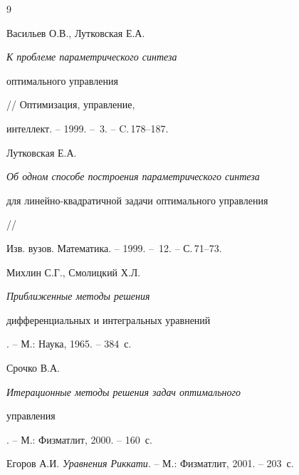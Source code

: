 \begin{thebibliography}{9}







Васильев О.В., Лутковская Е.А. {\it К проблеме параметрического синтеза 


оптимального управления} // Оптимизация, управление, 


интеллект. -- 1999. -- \No\,3. -- C.\,178--187.




Лутковская Е.А. {\it Об одном способе построения параметрического синтеза


для линейно-квадратичной задачи оптимального управления} //


Изв. вузов. Математика. -- 1999. -- \No\,12. -- С.\,71--73.




Михлин С.Г., Смолицкий Х.Л. {\it Приближенные методы решения 


дифференциальных и интегральных уравнений}. -- М.: Наука, 1965. -- 384~с.




Срочко В.А. {\it Итерационные методы решения задач оптимального 


управления}. -- М.: Физматлит, 2000. -- 160~с.




Егоров А.И. {\it Уравнения Риккати}. -- М.: Физматлит, 2001. -- 203~с.





\end{thebibliography}





\vskip 2cm












\label{end}





